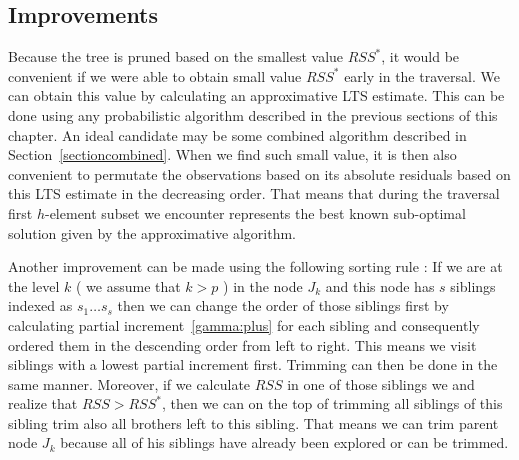 \subsection{Improvements}
Because the tree is pruned based on the smallest value $RSS^*$, it would be convenient if we were able to obtain small value $RSS^*$ early in the traversal. We can obtain this value by calculating an approximative LTS estimate. This can be done using any probabilistic algorithm described in the previous sections of this chapter. An ideal candidate may be some combined algorithm described in Section~\ref{sectioncombined}. When we find such small value, it is then also convenient to permutate the observations based on its absolute residuals based on this LTS estimate in the decreasing order. That means that during the traversal first $h$-element subset we encounter represents the best known sub-optimal solution given by the approximative algorithm.

Another improvement can be made using the following sorting rule : If we are at the level $k$ ( we assume that $k > p$ )
in the node $J_k$ and this node has $s$ siblings indexed as $s_1 \ldots s_s$ then we can change the order of those siblings first by calculating partial increment~\eqref{gamma:plus} for each sibling and consequently ordered them in the descending order from left to right. This means we visit siblings with a lowest partial increment first. Trimming can then be done in the same manner. Moreover, if we calculate $RSS$ in one of those siblings we and realize that $RSS > RSS^*$, then we can on the top of trimming all siblings of this sibling trim also all brothers left to this sibling. That means we can trim parent node $J_k$ because all of his siblings have already been explored or can be trimmed.





